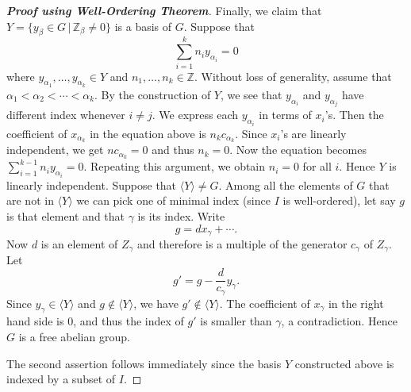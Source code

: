 \begin{proof}[\textbf{Proof using Well-Ordering Theorem}]
	Finally, we claim that $Y = \{y_\beta\in G\,|\, \mathbb{Z}_\beta \neq 0\}$ is a basis of $G$. Suppose that $$\sum_{i=1}^k n_{i}y_{\alpha_i} = 0$$
	where $y_{\alpha_1}, \dots, y_{\alpha_k}\in Y$ and $n_1,\dots, n_k\in\mathbb{Z}$. Without loss of generality, assume that $\alpha_1<\alpha_2<\cdots < \alpha_k$. By the construction of $Y$, we see that $y_{\alpha_i}$ and $y_{\alpha_j}$ have different index whenever $i\neq j$. We express each $y_{\alpha_i}$ in terms of $x_i$'s. Then the coefficient of $x_{\alpha_k}$ in the equation above is $n_kc_{\alpha_k}$. Since $x_i$'s are linearly independent, we get $nc_{\alpha_k} = 0$ and thus $n_k = 0$. Now the equation becomes $\sum_{i=1}^{k-1} n_{i}y_{\alpha_i} = 0$. Repeating this argument, we obtain $n_i = 0$ for all $i$.  Hence $Y$ is linearly independent. Suppose that  $\langle Y\rangle \ne G$. Among all the elements of $G$ that are not in $\langle Y\rangle$ we can pick one of minimal index (since $I$ is well-ordered), let say $g$ is that element and that $\gamma$ is its index. Write
	\[ g = d x_\gamma + \cdots. \]
	Now $d$ is an element of $Z_\gamma$ and therefore is a multiple of the generator $c_{\gamma}$ of   $Z_\gamma$. Let 
	\begin{equation*}
		g' = g - \frac{d}{c_{\gamma}}y_\gamma.
	\end{equation*}  Since $y_\gamma \in \langle Y\rangle$ and $g\not\in \langle Y\rangle$, we have $g'\not\in \langle Y\rangle$. The coefficient of $x_\gamma$ in the right hand side is $0$, and thus the index of $g'$ is smaller than $\gamma$, a contradiction. Hence $G$ is a free abelian group. 
	
	The second assertion follows immediately since the basis $Y$ constructed above is indexed by a subset of $I$.
\end{proof}
